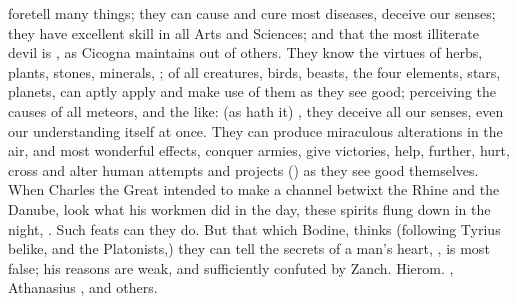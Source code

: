 foretell many things; they can cause and cure most
diseases, deceive our senses; they have excellent skill in all Arts and
Sciences; and that the most illiterate devil is , as Cicogna
maintains out of others. They know the virtues of herbs, plants, stones,
minerals, \etc{}; of all creatures, birds, beasts, the four elements, stars,
planets, can aptly apply and make use of them as they see good; perceiving the
causes of all meteors, and the like:  (as
\Austin{} hath it) , they deceive all our senses, even our
understanding itself at once. They can produce miraculous
alterations in the air, and most wonderful effects, conquer armies, give
victories, help, further, hurt, cross and alter human attempts and projects
() as they see good themselves. When
Charles the Great intended to make a channel betwixt the Rhine and the Danube,
look what his workmen did in the day, these spirits flung down in the night,
. Such feats can they do. But that
which Bodine,  thinks (following Tyrius
belike, and the Platonists,) they can tell the secrets of a man's heart,
, is most false; his reasons are weak, and
sufficiently confuted by Zanch.  Hierom.
, Athanasius
, and others.

